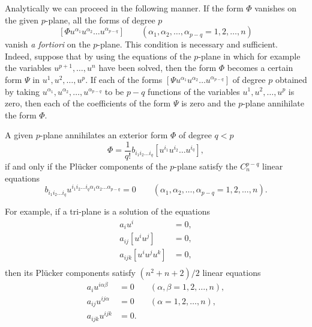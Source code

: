 Analytically we can proceed in the following manner. If the form $\Phi$ vanishes on the given $p$-plane, all the forms of degree $p$
\[
[\Phi u^{\alpha_{1}}u^{\alpha_{2}}\dots u^{\alpha_{p-q}}]\qquad(\alpha_{1},\alpha_{2},\dots,\alpha_{p-q}=1,2,\dots,n)
\]
vanish \emph{a fortiori} on the $p$-plane. This condition is necessary and sufficient. Indeed, suppose that by using the equations of the $p$-plane in which for example the variables $u^{p+1},\dots,u^{n}$ have been solved, then the form $\Phi$ becomes a certain form $\Psi$ in $u^{1},u^{2},\dots,u^{p}$. If each of the forms $[\Psi u^{\alpha_{1}}u^{\alpha_{2}}\dots u^{\alpha_{p-q}}]$ of degree $p$ obtained by taking $u^{\alpha_{1}},u^{\alpha_{2}},\dots,u^{\alpha_{p-q}}$ to be $p-q$ functions of the variables $u^{1},u^{2},\dots,u^{p}$ is zero, then each of the coefficients of the form $\Psi$ is zero and the $p$-plane annihilate the form $\Phi$.
\begin{thm*}
  A given $p$-plane  annihilates an exterior form $\Phi$ of degree $q<p$
\[
\Phi=\frac{1}{q!}b_{i_{1}i_{2}\dots i_{q}}[u^{i_{1}}u^{i_{2}}\dots u^{i_{q}}],
\]
if and only if the Pl\"ucker components of the $p$-plane satisfy the $C_{n}^{p-q}$ linear equations
\[
b_{i_{1}i_{2}\dots i_{q}}u^{i_{1}i_{2}\dots i_{q}\alpha_{1}\alpha_{2}\dots \alpha_{p-q}}=0\qquad (\alpha_{1},\alpha_{2},\dots,\alpha_{p-q}=1,2,\dots,n).
\]
\end{thm*}

For example, if a tri-plane is a solution of the equations
\begin{align*}
  a_{i}u^{i}&=0,\\
  a_{ij}[u^{i}u^{j}]&=0,\\
  a_{ijk}[u^{i}u^{j}u^{k}]&=0,\\
\end{align*}
then its Pl\"ucker components satisfy $({n^{2}+n+2})/{2}$ linear equations
\begin{align*}
  a_{i}u^{i\alpha\beta}&=0&&(\alpha,\beta=1,2,\dots,n),\\
  a_{ij}u^{ij\alpha}&=0&&(\alpha=1,2,\dots,n),\\
  a_{ijk}u^{ijk}&=0.&
\end{align*}

